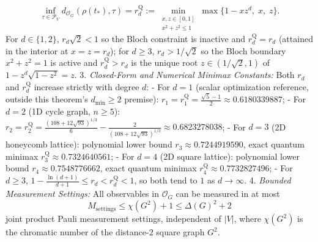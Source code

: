 \documentclass[
  11pt,
]{article}
\begin{document}
\[
   \inf_{\tau\in\mathcal{P}_V} d_{\mathcal{O}_G}(\rho(t_*), \tau) = r_d^{\mathrm{Q}} := \min_{\substack{x, z \in [0, 1] \\ x^2 + z^2 \le 1}} \max\bigl\{1 - x z^d,\; x,\; z\bigr\}.
   \]
For \(d \in \{1,2\}\), \(r_d\sqrt{2} < 1\) so the Bloch constraint is inactive and \(r_d^{\mathrm{Q}} = r_d\) (attained in the interior at \(x = z = r_d\)); for \(d \ge 3\), \(r_d > 1/\sqrt{2}\) so the Bloch boundary \(x^2+z^2=1\) is active and \(r_d^{\mathrm{Q}} > r_d\) is the unique root \(z \in (1/\sqrt{2}, 1)\) of \(1 - z^d\sqrt{1-z^2} = z\).
3. \emph{Closed-Form and Numerical Minimax Constants:} Both \(r_d\) and \(r_d^{\mathrm{Q}}\) increase strictly with degree \(d\):
- For \(d=1\) (scalar optimization reference, outside this theorem's \(d_{\min}\ge2\) premise): \(r_1 = r_1^{\mathrm{Q}} = \frac{\sqrt{5}-1}{2} \approx 0.6180339887\);
- For \(d=2\) (1D cycle graph, \(n\ge 5\)): \(r_2 = r_2^{\mathrm{Q}} = \frac{(108+12\sqrt{93})^{1/3}}{6} - \frac{2}{(108+12\sqrt{93})^{1/3}} \approx 0.6823278038\);
- For \(d=3\) (2D honeycomb lattice): polynomial lower bound \(r_3 \approx 0.7244919590\), exact quantum minimax \(r_3^{\mathrm{Q}} \approx 0.7324640561\);
- For \(d=4\) (2D square lattice): polynomial lower bound \(r_4 \approx 0.7548776662\), exact quantum minimax \(r_4^{\mathrm{Q}} \approx 0.7732827496\);
- For \(d\ge3\), \(1 - \frac{\ln(d+1)}{d+1} \le r_d < r_d^{\mathrm{Q}} < 1\), so both tend to \(1\) as \(d\to\infty\).
4. \emph{Bounded Measurement Settings:} All observables in \(\mathcal{O}_G\) can be measured in at most
\[
   M_{\mathrm{settings}} \le \chi(G^2) + 1 \le \Delta(G)^2 + 2
   \]
joint product Pauli measurement settings, independent of \(|V|\), where \(\chi(G^2)\) is the chromatic number of the distance-\(2\) square graph \(G^2\).
\end{document}
